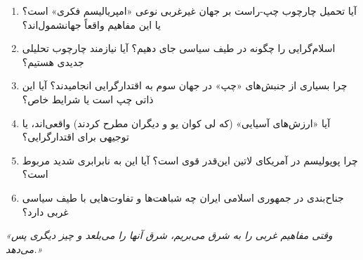 \begin{questionbox}
\begin{enumerate}
    \item آیا تحمیل چارچوب چپ-راست بر جهان غیرغربی نوعی «امپریالیسم فکری» است؟ یا این مفاهیم واقعاً جهانشمول‌اند؟
    
    \item اسلام‌گرایی را چگونه در طیف سیاسی جای دهیم؟ آیا نیازمند چارچوب تحلیلی جدیدی هستیم؟
    
    \item چرا بسیاری از جنبش‌های «چپ» در جهان سوم به اقتدارگرایی انجامیدند؟ آیا این ذاتی چپ است یا شرایط خاص؟
    
    \item آیا «ارزش‌های آسیایی» (که لی کوان یو و دیگران مطرح کردند) واقعی‌اند، یا توجیهی برای اقتدارگرایی؟
    
    \item چرا پوپولیسم در آمریکای لاتین این‌قدر قوی است؟ آیا این به نابرابری شدید مربوط است؟
    
    \item جناح‌بندی در جمهوری اسلامی ایران چه شباهت‌ها و تفاوت‌هایی با طیف سیاسی غربی دارد؟
\end{enumerate}
\end{questionbox}

\begin{quotebox}
\textit{«وقتی مفاهیم غربی را به شرق می‌بریم، شرق آنها را می‌بلعد و چیز دیگری پس می‌دهد.»}
\end{quotebox}

